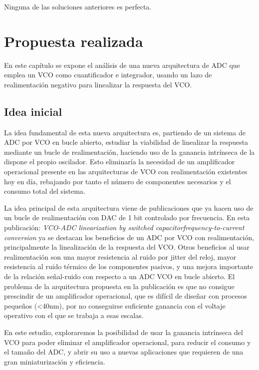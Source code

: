 \documentclass[12pt]{report} %
\begin{document}
	Ninguna de las soluciones anteriores es perfecta.
	
\chapter{Propuesta realizada}
	
	En este capítulo se expone el análisis de una nueva arquitectura de ADC que emplea un VCO como cuantificador e integrador, usando un lazo de realimentación negativo para linealizar la respuesta del VCO.
	
	\section{Idea inicial}\label{sc:initial-idea}
	
	La idea fundamental de esta nueva arquitectura es, partiendo de un sistema de ADC por VCO en bucle abierto, estudiar la viabilidad de linealizar la respuesta mediante un bucle de realimentación, haciendo uso de la ganancia intrínseca de la dispone el propio oscilador. Esto eliminaría la necesidad de un amplificador operacional presente en las arquitecturas de VCO con realimentación existentes hoy en día, rebajando por tanto el número de componentes necesarios y el consumo total del sistema.
	
	La idea principal de esta arquitectura viene de publicaciones que ya hacen uso de un bucle de realimentación con DAC de 1 bit controlado por frecuencia. En esta publicación: \textit{VCO-ADC linearization by switched capacitorfrequency-to-current conversion}\cite{vco-adc-ruben-eric} ya se destacan los beneficios de un ADC por VCO con realimentación, principalmente la linealización de la respuesta del VCO. Otros beneficios al usar realimentación son una mayor resistencia al ruido por jitter del reloj, mayor resistencia al ruido térmico de los componentes pasivos, y una mejora importante de la relación señal-ruido con respecto a un ADC VCO en bucle abierto. El problema de la arquitectura propuesta en la publicación es que no consigue prescindir de un amplificador operacional, que es difícil de diseñar con procesos pequeños (<40nm), por no conseguirse suficiente ganancia con el voltaje operativo con el que se trabaja a esas escalas.
	
	En este estudio, exploraremos la posibilidad de usar la ganancia intrínseca del VCO para poder eliminar el amplificador operacional, para reducir el consumo y el tamaño del ADC, y abrir su uso a nuevas aplicaciones que requieren de una gran miniaturización y eficiencia.
	
\end{document}
